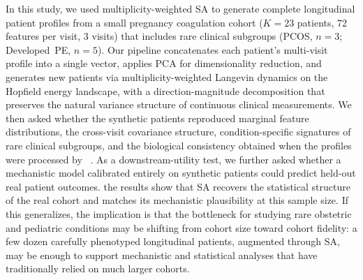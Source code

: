In this study, we used multiplicity-weighted SA to generate complete
longitudinal patient profiles from a small pregnancy coagulation cohort
($K{=}23$ patients, 72 features per visit, 3 visits) that includes rare
clinical subgroups (PCOS, $n{=}3$; Developed~PE, $n{=}5$). Our pipeline
concatenates each patient's multi-visit profile into a single vector, applies
PCA for dimensionality reduction, and generates new patients via
multiplicity-weighted Langevin dynamics on the Hopfield energy landscape, with
a direction-magnitude decomposition that preserves the natural variance
structure of continuous clinical measurements. We then asked whether the
synthetic patients reproduced marginal feature distributions, the cross-visit
covariance structure, condition-specific signatures of rare clinical
subgroups, and the biological consistency obtained when the profiles were processed by
~\citep{BrummelZiedins2012}. As a downstream-utility test, we further
asked whether a mechanistic model calibrated entirely on synthetic patients
could predict held-out real patient outcomes.  the
results show that SA recovers the statistical structure of the real cohort and
matches its mechanistic plausibility at this sample size. If this generalizes, the implication is that the bottleneck
for studying rare obstetric and pediatric conditions may be shifting from
cohort size toward cohort fidelity: a few dozen carefully phenotyped
longitudinal patients, augmented through SA, may be enough to support
mechanistic and statistical analyses that have traditionally relied on much
larger cohorts.
